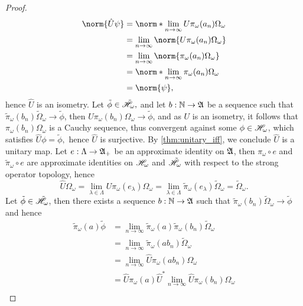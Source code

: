 \begin{proof}
    \begin{align*}
        \norm{\hat{U}\psi}
        &= \norm*{\lim_{n\to\infty}{U \pi_{\omega}(a_n)\Omega_\omega}}\\
        &= \lim_{n\to\infty}{\norm{U\pi_\omega(a_n)\Omega_\omega}}\\
        &= \lim_{n\to\infty}{\norm{\pi_{\omega}(a_n)\Omega_\omega}}\\
        &= \norm*{\lim_{n\to\infty}{\pi_\omega(a_n)\Omega_\omega}}\\
        &= \norm{\psi},
    \end{align*}
    hence \(\hat{U}\) is an isometry. Let \(\tilde{\phi} \in \tilde{\mathscr{H}}_\omega,\) and let \(b : \mathbb{N} \to \mathfrak{A}\) be a sequence such that \(\tilde{\pi}_\omega(b_n)\tilde{\Omega}_\omega \to \tilde{\phi}\), then \(U\pi_\omega(b_n)\Omega_\omega \to \tilde{\phi}\), and as \(U\) is an isometry, it follows that \(\pi_\omega(b_n)\Omega_\omega\) is a Cauchy sequence, thus convergent against some \(\phi \in \mathscr{H}_\omega\), which satisfies \(\hat{U} \phi = \tilde{\phi},\) hence \(\hat{U}\) is surjective. By \cref{thm:unitary_iff}, we conclude \(\hat{U}\) is a unitary map. Let \(e : \Lambda \to \mathfrak{A}_+\) be an approximate identity on \(\mathfrak{A}\), then \(\pi_\omega \circ e\) and \(\tilde{\pi}_\omega \circ e\) are approximate identities on \(\mathscr{H}_\omega\) and \(\tilde{\mathscr{H}}_\omega\) with respect to the strong operator topology, hence 
    \begin{equation*}
        \hat{U} \Omega_\omega = \lim_{\lambda \in \Lambda}{U \pi_\omega(e_\lambda) \Omega_\omega =}\lim_{\lambda \in \Lambda}{\tilde{\pi}_\omega(e_\lambda)\tilde{\Omega}_\omega}= \tilde{\Omega}_\omega.
    \end{equation*}
    Let \(\tilde{\phi} \in \tilde{\mathscr{H}}_\omega\), then there exists a sequence \(b : \mathbb{N} \to \mathfrak{A}\) such that \(\tilde{\pi}_\omega(b_n)\tilde{\Omega}_\omega \to \tilde{\phi}\) and hence
    \begin{align*}
        \tilde{\pi}_\omega(a)\tilde{\phi} &= \lim_{n\to\infty}{\tilde{\pi}_{\omega}(a)\tilde{\pi}_\omega(b_n)\tilde{\Omega}_\omega}\\
                                          &= \lim_{n\to\infty}{\tilde{\pi}_{\omega}(ab_n)\tilde{\Omega}_\omega}\\
                                          &= \lim_{n\to\infty}{\hat{U}\pi_{\omega}(ab_n)\Omega_\omega}\\
                                          &= \hat{U}\pi_{\omega}(a)\hat{U}^*\lim_{n\to\infty}{\hat{U}\pi_{\omega}(b_n)\Omega_\omega}\\

\end{align*}
\end{proof}
